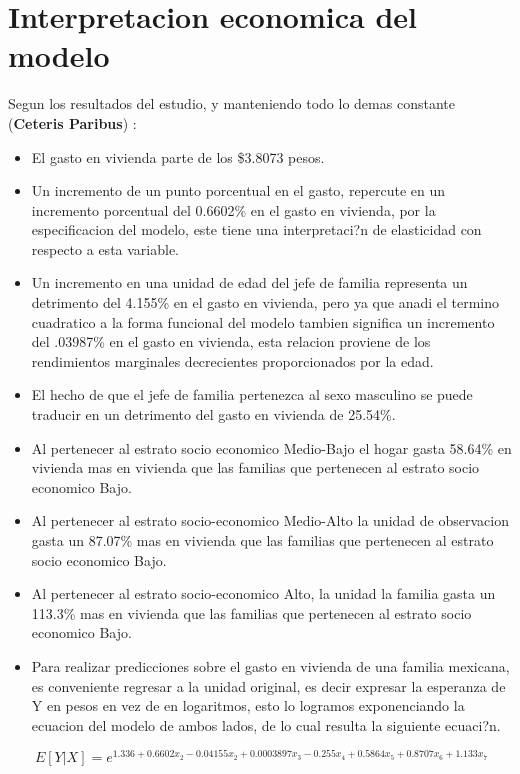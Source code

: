 \documentclass[]{book}
\begin{document}
\chapter{Interpretacion economica del
modelo}\label{interpretacion-economica-del-modelo}

Segun los resultados del estudio, y manteniendo todo lo demas constante
(\textbf{Ceteris Paribus}) :

\begin{itemize}
\item
  El gasto en vivienda parte de los \$3.8073 pesos.
\item
  Un incremento de un punto porcentual en el gasto, repercute en un
  incremento porcentual del 0.6602\% en el gasto en vivienda, por la
  especificacion del modelo, este tiene una interpretaci?n de
  elasticidad con respecto a esta variable.
\item
  Un incremento en una unidad de edad del jefe de familia representa un
  detrimento del 4.155\% en el gasto en vivienda, pero ya que anadi el
  termino cuadratico a la forma funcional del modelo tambien significa
  un incremento del .03987\% en el gasto en vivienda, esta relacion
  proviene de los rendimientos marginales decrecientes proporcionados
  por la edad.
\item
  El hecho de que el jefe de familia pertenezca al sexo masculino se
  puede traducir en un detrimento del gasto en vivienda de 25.54\%.
\item
  Al pertenecer al estrato socio economico Medio-Bajo el hogar gasta
  58.64\% en vivienda mas en vivienda que las familias que pertenecen al
  estrato socio economico Bajo.
\item
  Al pertenecer al estrato socio-economico Medio-Alto la unidad de
  observacion gasta un 87.07\% mas en vivienda que las familias que
  pertenecen al estrato socio economico Bajo.
\item
  Al pertenecer al estrato socio-economico Alto, la unidad la familia
  gasta un 113.3\% mas en vivienda que las familias que pertenecen al
  estrato socio economico Bajo.
\item
  Para realizar predicciones sobre el gasto en vivienda de una familia
  mexicana, es conveniente regresar a la unidad original, es decir
  expresar la esperanza de Y en pesos en vez de en logaritmos, esto lo
  logramos exponenciando la ecuacion del modelo de ambos lados, de lo
  cual resulta la siguiente ecuaci?n.
\end{itemize}

\[ \ E[Y| X] = e^{1.336 + 0.6602x_{2} - 0.04155x_{2} + 0.0003897x_{3} -0.255x_{4} + 0.5864x_{5} + 0.8707x_{6} + 1.133x_{7}}  \]
\end{document}
